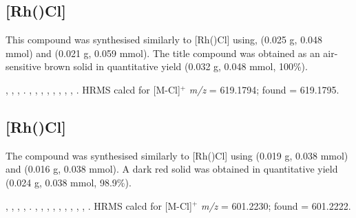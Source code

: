 
\subsection*{[Rh(\tButhixantphosk)Cl]}


This compound was synthesised similarly to [Rh(\tBusixantphos)Cl] using, \tButhixantphos{} (0.025 g, 0.048 mmol) and  (0.021 g, 0.059 mmol).  The title compound was obtained as an air-sensitive brown solid in quantitative yield (0.032 g, 0.048 mmol, 100\%).  

,
,
,
.
,
,
,
,
,
,
,
,
.
HRMS calcd for  [M-Cl]$^+$ \emph{m/z} = 619.1794; found = 619.1795.



\subsection*{[Rh(\tBuxantphosk)Cl]}


The compound was synthesised similarly to [Rh(\tBusixantphos)Cl] using \tBuxantphos{} (0.019 g, 0.038 mmol) and  (0.016 g, 0.038 mmol).  A dark red solid was obtained in quantitative yield (0.024 g, 0.038 mmol, 98.9\%).  

,
,
,
,
.
,
,
,
,
,
,
,
,
,
.
HRMS calcd for  [M-Cl]$^+$ \emph{m/z} = 601.2230; found = 601.2222.


